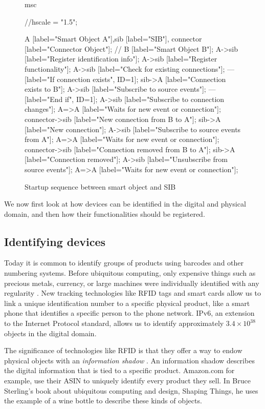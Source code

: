 \begin{figure}[bth]
\begin{msc}
msc {
	//hscale = "1.5";
	
    A [label="Smart Object A"],sib [label="SIB"], connector [label="Connector Object"]; // B [label="Smart Object B"];
	A->sib [label="Register identification info"];
	A->sib [label="Register functionality"];
    A->sib [label="Check for existing connections"];
    --- [label="If connection exists", ID=1];
    sib->A [label="Connection exists to B"];
    A->sib [label="Subscribe to source events"];
    --- [label="End if", ID=1];
    A->sib [label="Subscribe to connection changes"];
    A=>A [label="Waits for new event or connection"];
    connector->sib [label="New connection from B to A"];
    sib->A [label="New connection"];
    A->sib [label="Subscribe to source events from A"];
    A=>A [label="Waits for new event or connection"];
    connector->sib [label="Connection removed from B to A"];
    sib->A [label="Connection removed"];
    A->sib [label="Unsubscribe from source events"];
    A=>A [label="Waits for new event or connection"];
}
\end{msc}
        \caption{Startup sequence between smart object and SIB}
        \label{connectorsibSequence}
\end{figure}

We now first look at how devices can be identified in the digital and physical domain, and then how their functionalities should be registered.

\subsection{Identifying devices}

Today it is common to identify groups of products using barcodes and other numbering systems. Before ubiquitous computing, only expensive things such as precious metals, currency, or large machines were individually identified with any regularity \cite{Kuniavsky}. New tracking technologies like \ac{RFID} tags and smart cards allow us to link a unique identification number to a specific physical product, like a smart phone that identifies a specific person to the phone network. IPv6, an extension to the Internet Protocol standard, allows us to identify approximately $3.4 \times 10^{38} $ objects in the digital domain.

The significance of technologies like \ac{RFID} is that they offer a way to endow physical objects with an \emph{information shadow} \cite{Greenfield2006}. An information shadow describes the digital information that is tied to a specific product. Amazon.com for example, use their \ac{ASIN} to uniquely identify every product they sell. In Bruce Sterling's book about ubiquitous computing and design, Shaping Things, he uses the example of a wine bottle to describe these kinds of objects. 

